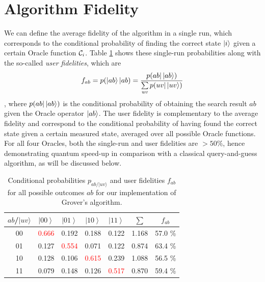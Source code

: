 \section{Algorithm Fidelity}

We can define the average fidelity of the algorithm in a single run, which corresponds to the conditional probability of finding the correct state $\left| i \right>$ given a certain Oracle function $\Or_i$.  Table \ref{tab:Probabilities-for-obtaining} shows these single-run probabilities along with the so-called {\it user fidelities}, which are
%
\begin{equation}
f_{ab} = p(\left| ab \right>|ab) = \frac{p(ab |\left| ab \right>)}{\sum\limits_{uv}p(uv|\left| uv \right>)} 
\end{equation}
%
, where $p(ab|\left| ab \right>)$ is the conditional probability of obtaining the search result $ab$ given the Oracle operator $\left| ab \right>$. The user fidelity is complementary to the average fidelity and correspond to the conditional probability of having found the correct state given a certain measured state, averaged over all possible Oracle functions. For all four Oracles, both the single-run and user fidelities are $> 50 \%$, hence demonstrating quantum speed-up in comparison with a classical query-and-guess algorithm, as will be discussed below.

\begin{table}[H]
\begin{centering}
\begin{tabular}{|c|c|c|c|c|c|c|}
\hline 
$ab$/$|uv\rangle$ & $\left|00\right\rangle $ & $\left|01\right\rangle $ & $\left|10\right\rangle $ & $\left|11\right\rangle $ & $\sum$ & $f_{ab}$\tabularnewline
\hline
\hline 
00 & \textcolor{red}{0.666} & 0.192 & 0.188 & 0.122 & 1.168 & 57.0 \%\tabularnewline
\hline 
01 & 0.127 & \textcolor{red}{0.554} & 0.071 & 0.122 & 0.874 & 63.4 \%\tabularnewline
\hline 
10 & 0.128 & 0.106 & \textcolor{red}{0.615} & 0.239 & 1.088 & 56.5 \%\tabularnewline
\hline 
11 & 0.079 & 0.148 & 0.126 & \textcolor{red}{0.517} & 0.870 & 59.4 \%\tabularnewline
\hline
\end{tabular}
\par\end{centering}

\caption{\label{tab:Probabilities-for-obtaining}Conditional probabilities
$p_{ab/|uv\rangle}$ and user fidelities $f_{ab}$ for all
possible outcomes $ab$ for our implementation of Grover's algorithm.}

\end{table}


